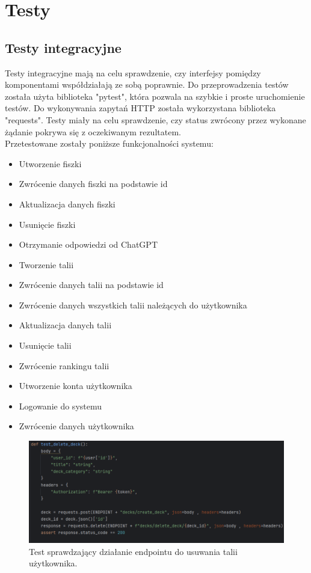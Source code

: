 \chapter{Testy}

\section{Testy integracyjne}

Testy integracyjne mają na celu sprawdzenie, czy interfejsy pomiędzy komponentami współdziałają ze sobą poprawnie.\cite{mielnikIntegrationTests} Do przeprowadzenia testów została użyta biblioteka "pytest", która pozwala na szybkie i proste uruchomienie testów.\cite{oliveira2018} Do wykonywania zapytań HTTP została wykorzystana biblioteka "requests". Testy miały na celu sprawdzenie, czy status zwrócony przez wykonane żądanie pokrywa się z oczekiwanym rezultatem.\\
Przetestowane zostały poniższe funkcjonalności systemu:

\begin{itemize}
    \item Utworzenie fiszki
    \item Zwrócenie danych fiszki na podstawie id
    \item Aktualizacja danych fiszki
    \item Usunięcie fiszki
    \item Otrzymanie odpowiedzi od ChatGPT
    \item Tworzenie talii
    \item Zwrócenie danych talii na podstawie id
    \item Zwrócenie danych wszystkich talii należących do użytkownika
    \item Aktualizacja danych talii
    \item Usunięcie talii
    \item Zwrócenie rankingu talii
    \item Utworzenie konta użytkownika
    \item Logowanie do systemu
    \item Zwrócenie danych użytkownika
\end{itemize}

\begin{figure}[H]
    \centering
    \includegraphics[width=1\textwidth]{chapters/chapter_9/testy1}
    \caption{Test sprawdzający działanie endpointu do usuwania talii użytkownika.}
    \label{img:testy}
\end{figure}

